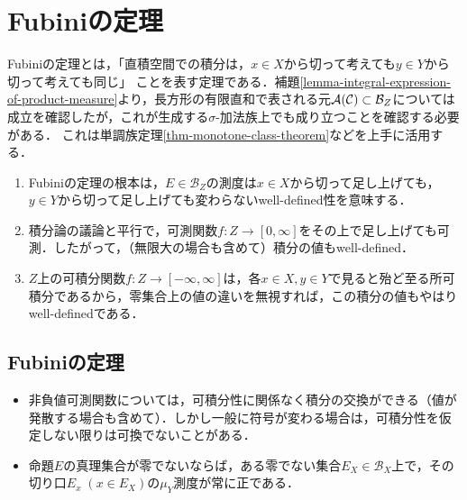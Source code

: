 \documentclass[uplatex, dvipdfmx]{jsreport}
\renewcommand{\B}{\mathcal{B}}
\begin{document}
\section{Fubiniの定理}

\begin{tcolorbox}[colframe=ForestGreen, colback=ForestGreen!10!white,breakable,colbacktitle=ForestGreen!40!white,coltitle=black,fonttitle=\bfseries\sffamily,
title=積分の可換性]
    Fubiniの定理とは，「直積空間での積分は，$x\in X$から切って考えても$y\in Y$から切って考えても同じ」
    ことを表す定理である．補題\ref{lemma-integral-expression-of-product-measure}より，長方形の有限直和で表される元$\A(\cC)\subset\B_Z$については成立を確認したが，これが生成する$\sigma$-加法族上でも成り立つことを確認する必要がある．
    これは単調族定理\ref{thm-monotone-class-theorem}などを上手に活用する．
    \begin{enumerate}
        \item Fubiniの定理の根本は，$E\in\B_Z$の測度は$x\in X$から切って足し上げても，$y\in Y$から切って足し上げても変わらないwell-defined性を意味する．
        \item 積分論の議論と平行で，可測関数$f:Z\to[0,\infty]$をその上で足し上げても可測．したがって，（無限大の場合も含めて）積分の値もwell-defined．
        \item $Z$上の可積分関数$f:Z\to[-\infty,\infty]$は，各$x\in X,y\in Y$で見ると殆ど至る所可積分であるから，零集合上の値の違いを無視すれば，この積分の値もやはりwell-definedである．
    \end{enumerate}
\end{tcolorbox}

\subsection{Fubiniの定理}

\begin{tcolorbox}[colframe=ForestGreen, colback=ForestGreen!10!white,breakable,colbacktitle=ForestGreen!40!white,coltitle=black,fonttitle=\bfseries\sffamily,
title=]
    \begin{itemize}
        \item 非負値可測関数については，可積分性に関係なく積分の交換ができる（値が発散する場合も含めて）．しかし一般に符号が変わる場合は，可積分性を仮定しない限りは可換でないことがある．
        \item 命題$E$の真理集合が零でないならば，ある零でない集合$E_X\in\B_X$上で，その切り口$E_x\;(x\in E_X)$の$\mu_Y$測度が常に正である．
    \end{itemize}
\end{tcolorbox}
\end{document}
